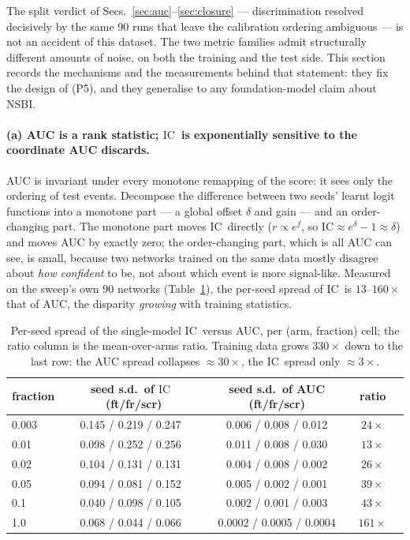 \documentclass[11pt]{article}
\newcommand{\IC}{\ensuremath{\mathrm{IC}}}
\begin{document}
The split verdict of Secs.~\ref{sec:auc}--\ref{sec:closure} --- discrimination resolved
decisively by the same 90 runs that leave the calibration ordering ambiguous --- is not an
accident of this dataset. The two metric families admit structurally different amounts of
noise, on both the training and the test side. This section records the mechanisms and the
measurements behind that statement: they fix the design of (P5), and they generalise to
any foundation-model claim about NSBI.

\paragraph{(a) AUC is a rank statistic; \IC\ is exponentially sensitive to the coordinate
AUC discards.} AUC is invariant under every monotone remapping of the score: it sees only
the ordering of test events. Decompose the difference between two seeds' learnt logit
functions into a monotone part --- a global offset $\delta$ and gain --- and an
order-changing part. The monotone part moves \IC\ directly
($r \propto e^{f}$, so $\IC \approx e^{\delta}-1 \approx \delta$) and moves AUC by exactly
zero; the order-changing part, which is all AUC can see, is small, because two networks
trained on the same data mostly disagree about \emph{how confident} to be, not about which
event is more signal-like. Measured on the sweep's own 90 networks
(Table~\ref{tab:seednoise}), the per-seed spread of \IC\ is $13$--$160\times$ that of AUC,
the disparity \emph{growing} with training statistics.

\begin{table}[h]\centering\small
\begin{tabular}{@{}lcccc@{}}
\toprule
fraction & seed s.d.\ of \IC\ (ft/fr/scr) & seed s.d.\ of AUC (ft/fr/scr) & ratio \\
\midrule
0.003 & 0.145 / 0.219 / 0.247 & 0.006 / 0.008 / 0.012 & $24\times$ \\
0.01  & 0.098 / 0.252 / 0.256 & 0.011 / 0.008 / 0.030 & $13\times$ \\
0.02  & 0.104 / 0.131 / 0.131 & 0.004 / 0.008 / 0.002 & $26\times$ \\
0.05  & 0.094 / 0.081 / 0.152 & 0.005 / 0.002 / 0.001 & $39\times$ \\
0.1   & 0.040 / 0.098 / 0.105 & 0.002 / 0.001 / 0.003 & $43\times$ \\
1.0   & 0.068 / 0.044 / 0.066 & 0.0002 / 0.0005 / 0.0004 & $161\times$ \\
\bottomrule
\end{tabular}
\caption{Per-seed spread of the single-model \IC\ versus AUC, per (arm, fraction) cell;
the ratio column is the mean-over-arms ratio. Training data grows $330\times$ down to the
last row: the AUC spread collapses ${\approx}30\times$, the \IC\ spread only
${\approx}3\times$.}
\label{tab:seednoise}
\end{table}
\end{document}
